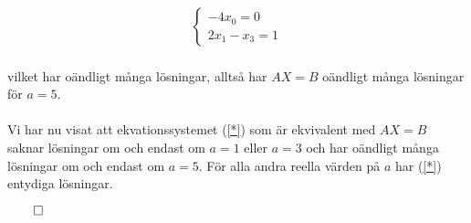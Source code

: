 \documentclass{article}
\begin{document}
\begin{gather*}
  \begin{cases}
    -4x_{0} = 0 \\
    2x_{1} - x_{3} = 1
  \end{cases}
\end{gather*}
\\
vilket har oändligt många lösningar, alltså har $AX = B$ oändligt många lösningar för $a = 5$.
\\
\\
Vi har nu visat att ekvationssystemet (\ref{*}) som är ekvivalent med $AX = B$ saknar lösningar om och endast om $a = 1$ eller $a = 3$ och har oändligt många lösningar om och endast om $a = 5$. För alla andra reella värden på $a$ har (\ref{*}) entydiga lösningar.
\\
\centerline{$\qed$}
\end{document}
